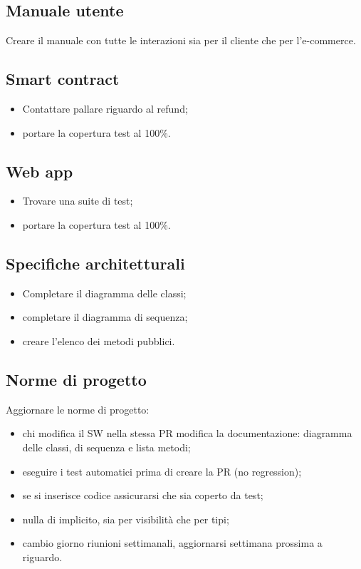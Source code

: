 \documentclass[a4paper, 12pt]{article}
\begin{document}
\subsection{Manuale utente}
Creare il manuale con tutte le interazioni sia  per il cliente che per l'e-commerce.

\subsection{Smart contract}
\begin{itemize}
\item Contattare pallare riguardo al refund;
\item portare la copertura test al 100\%.
\end{itemize}

\subsection{Web app}
\begin{itemize}
	\item Trovare una suite di test;
	\item portare la copertura test al 100\%.
\end{itemize}	

\subsection{Specifiche architetturali}
\begin{itemize}
	\item Completare il diagramma delle classi;
	\item completare il diagramma di sequenza;
	\item creare l'elenco dei metodi pubblici.
\end{itemize}

\subsection{Norme di progetto}
Aggiornare le norme di progetto:
\begin{itemize}
	\item chi modifica il SW nella stessa PR modifica la documentazione: diagramma delle classi, di sequenza e lista metodi;
    \item eseguire i test automatici prima di creare la PR (no regression);
    \item se si inserisce codice assicurarsi che sia coperto da test;
    \item nulla di implicito, sia per visibilità che per tipi;
    \item cambio giorno riunioni settimanali, aggiornarsi settimana prossima a riguardo.
\end{itemize}
\end{document}
